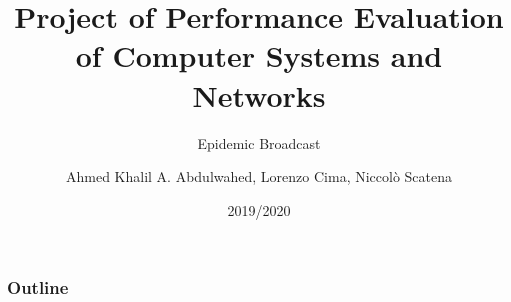 \documentclass{beamer}
\title{Project of Performance Evaluation of Computer Systems and Networks}
\subtitle{Epidemic Broadcast}
\author{Ahmed Khalil A. Abdulwahed, Lorenzo Cima, Niccolò Scatena}
\institute{University of Pisa}
\date{2019/2020}
\begin{document}
\begin{frame}
	\titlepage
\end{frame}

\begin{frame}
	\frametitle{Outline}
	\tableofcontents
\end{frame}
\end{document}
